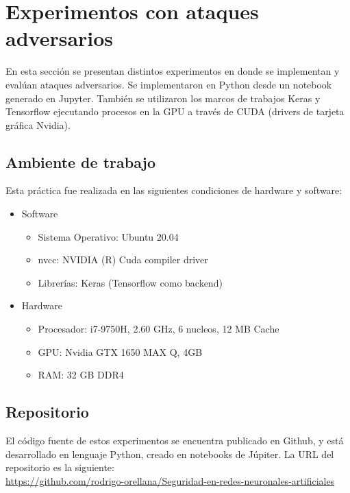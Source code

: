 

\chapter{Experimentos con ataques adversarios} %

\label{Experimentos} %


En esta sección se presentan distintos experimentos en donde se implementan y evalúan ataques adversarios. Se implementaron en Python desde un notebook generado en Jupyter. También se utilizaron los marcos de trabajos Keras y Tensorflow ejecutando procesos en la GPU a través de CUDA (drivers de tarjeta gráfica Nvidia).


\section{Ambiente de trabajo}
Esta práctica fue realizada en las siguientes condiciones de hardware y software:
\begin{itemize}
    \item Software
        \begin{itemize}
            \item Sistema Operativo: Ubuntu 20.04
            \item nvcc: NVIDIA (R) Cuda compiler driver
            \item Librerías: Keras (Tensorflow como backend)
        \end{itemize}
    \item Hardware
        \begin{itemize}
            \item Procesador: i7-9750H, 2.60 GHz, 6 nucleos, 12 MB Cache
            \item GPU: Nvidia GTX 1650 MAX Q, 4GB
            \item RAM: 32 GB DDR4
        \end{itemize}
\end{itemize}


\section{Repositorio}
El código fuente de estos experimentos se encuentra publicado en Github, y está desarrollado en lenguaje Python, creado en notebooks de Júpiter.
La URL del repositorio es la siguiente:\\ \url{https://github.com/rodrigo-orellana/Seguridad-en-redes-neuronales-artificiales}



